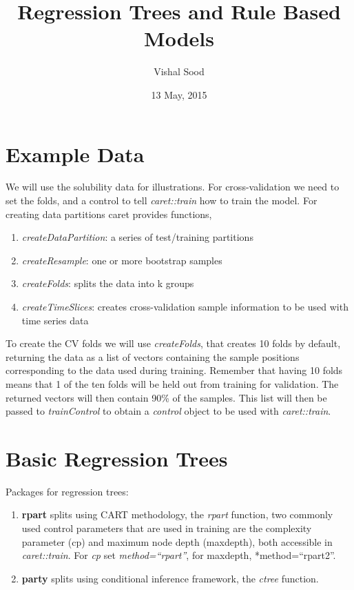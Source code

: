 \documentclass[]{article}
\title{Regression Trees and Rule Based Models}
\author{Vishal Sood}
\date{13 May, 2015}
\begin{document}
\maketitle


\section{Example Data}\label{example-data}

We will use the solubility data for illustrations. For cross-validation
we need to set the folds, and a control to tell \emph{caret::train} how
to train the model. For creating data partitions caret provides
functions,

\begin{enumerate}
\def\labelenumi{\arabic{enumi}.}
\itemsep1pt\parskip0pt
\item
  \emph{createDataPartition}: a series of test/training partitions
\item
  \emph{createResample}: one or more bootstrap samples
\item
  \emph{createFolds}: splits the data into k groups
\item
  \emph{createTimeSlices}: creates cross-validation sample information
  to be used with time series data
\end{enumerate}

To create the CV folds we will use \emph{createFolds}, that creates 10
folds by default, returning the data as a list of vectors containing the
sample positions corresponding to the data used during training.
Remember that having 10 folds means that 1 of the ten folds will be held
out from training for validation. The returned vectors will then contain
90\% of the samples. This list will then be passed to
\emph{trainControl} to obtain a \emph{control} object to be used with
\emph{caret::train}.

\section{Basic Regression Trees}\label{basic-regression-trees}

Packages for regression trees:

\begin{enumerate}
\def\labelenumi{\arabic{enumi}.}
\itemsep1pt\parskip0pt
\item
  \textbf{rpart} splits using CART methodology, the \emph{rpart}
  function, two commonly used control parameters that are used in
  training are the complexity parameter (cp) and maximum node depth
  (maxdepth), both accessible in \emph{caret::train}. For \emph{cp} set
  \emph{method=``rpart''}, for maxdepth, *method=``rpart2''.
\item
  \textbf{party} splits using conditional inference framework, the
  \emph{ctree} function.
\end{enumerate}
\end{document}
